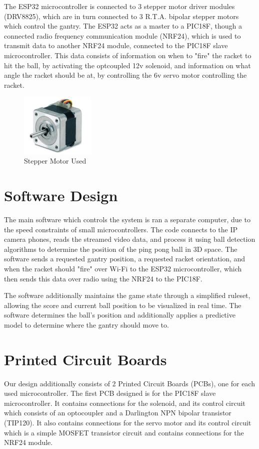 The ESP32 microcontroller is connected to 3 stepper motor driver modules (DRV8825), which are in turn connected to 3 R.T.A. bipolar stepper motors which control the gantry. The ESP32 acts as a master to a PIC18F, though a connected radio frequency communication module (NRF24), which is used to transmit data to another NRF24 module, connected to the PIC18F slave microcontroller. This data consists of information on when to "fire" the racket to hit the ball, by activating the optcoupled 12v solenoid, and information on what angle the racket should be at, by controlling the 6v servo motor controlling the racket.

\begin{figure}[h]
	\centering\includegraphics[height=3cm]{./images/steppermotor}
	\caption{Stepper Motor Used}
\end{figure}

\section{Software Design}
The main software which controls the system is ran a separate computer, due to the speed constraints of small microcontrollers. The code connects to the IP camera phones, reads the streamed video data, and process it using ball detection algorithms to determine the position of the ping pong ball in 3D space. The software sends a requested gantry position, a requested racket orientation, and when the racket should "fire" over Wi-Fi to the ESP32 microcontroller, which then sends this data over radio using the NRF24 to the PIC18F.

The software additionally maintains the game state through a simplified ruleset, allowing the score and current ball position to be visualized in real time. The software determines the ball's position and additionally applies a predictive model to determine where the gantry should move to.


\section{Printed Circuit Boards}

Our design additionally consists of 2 Printed Circuit Boards (PCBs), one for each used microcontroller. The first PCB designed is for the PIC18F slave microcontroller. It contains connections for the solenoid, and its control circuit which consists of an optocoupler and a Darlington NPN bipolar transistor (TIP120). It also contains connections for the servo motor and its control circuit which is a simple MOSFET transistor circuit and contains connections for the NRF24 module.


